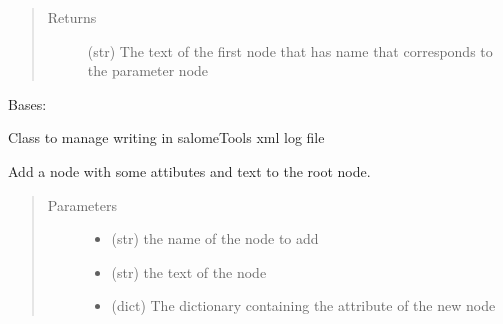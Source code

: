 \documentclass[a4paper,10pt,english]{sphinxmanual}
\begin{document}
\begin{fulllineitems}
\begin{fulllineitems}
\begin{quote}
\begin{description}
\item[{Returns}] \leavevmode
(str) 
The text of the first node that has name 
that corresponds to the parameter node

\end{description}\end{quote}

\end{fulllineitems}


\end{fulllineitems}


\begin{fulllineitems}
\label{\detokenize{apidoc_src/src:src.xmlManager.XmlLogFile}}
Bases: 

Class to manage writing in salomeTools xml log file

\begin{fulllineitems}
\label{\detokenize{apidoc_src/src:src.xmlManager.XmlLogFile.add_simple_node}}
Add a node with some attibutes and text to the root node.
\begin{quote}\begin{description}
\item[{Parameters}] \leavevmode\begin{itemize}
\item {} 
 \textendash{} (str) the name of the node to add

\item {} 
 \textendash{} (str) the text of the node

\item {} 
 \textendash{} (dict)
The dictionary containing the attribute of the new node

\end{itemize}

\end{description}\end{quote}


\end{fulllineitems}
\end{fulllineitems}
\end{document}

